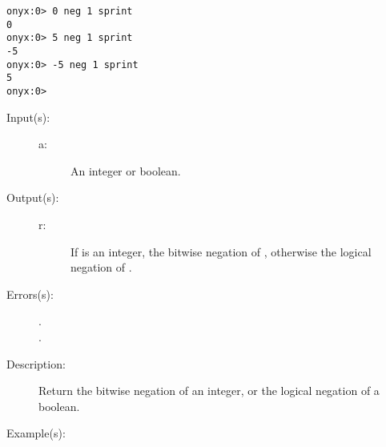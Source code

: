 \begin{description}
\begin{description}
\begin{verbatim}
onyx:0> 0 neg 1 sprint
0
onyx:0> 5 neg 1 sprint
-5
onyx:0> -5 neg 1 sprint
5
onyx:0>
		\end{verbatim}
	\end{description}
\label{systemdict:not}
\item[{\onyxop{a}{not}{r}}: ]
	\begin{description}\item[]
	\item[Input(s): ]
		\begin{description}\item[]
		\item[a: ]
			An integer or boolean.
		\end{description}
	\item[Output(s): ]
		\begin{description}\item[]
		\item[r: ]
			If  is an integer, the bitwise negation of
			, otherwise the logical negation of .
		\end{description}
	\item[Errors(s): ]
		\begin{description}\item[]
		\item[.]
		\item[.]
		\end{description}
	\item[Description: ]
		Return the bitwise negation of an integer, or the logical
		negation of a boolean.
	\item[Example(s): ]\begin{verbatim}


\end{verbatim}
\end{description}
\end{description}
